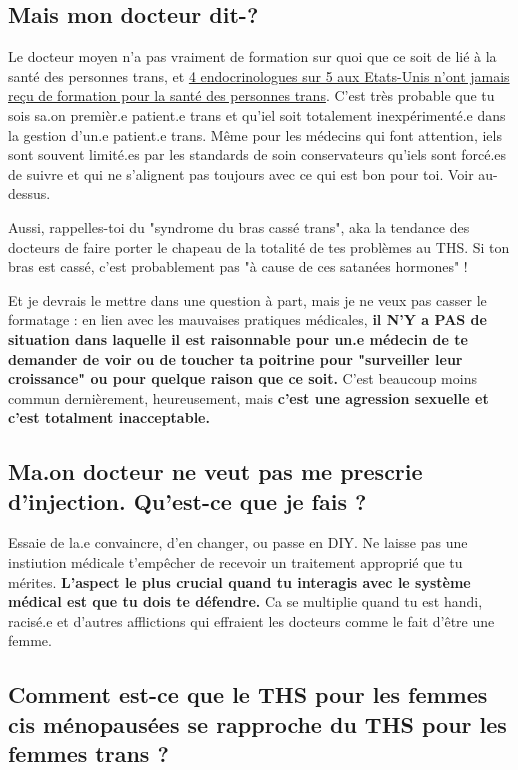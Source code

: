 \documentclass{article}
\begin{document}
\subsection{Mais mon docteur dit-?}

Le docteur moyen n'a pas vraiment de formation sur quoi que ce soit de lié à la santé des personnes trans, et \href{https://www.endocrine.org/news-and-advocacy/news-room/2017/endocrinologists-want-training-in-transgender-care }{4 endocrinologues sur 5 aux Etats-Unis n'ont jamais reçu de formation pour la santé des personnes trans}. C'est très probable que tu sois sa.on premièr.e patient.e trans et qu'iel soit totalement inexpérimenté.e dans la gestion d'un.e patient.e trans. Même pour les médecins qui font attention, iels sont souvent limité.es par les standards de soin conservateurs qu'iels sont forcé.es de suivre et qui ne s'alignent pas toujours avec ce qui est bon pour toi. Voir au-dessus.

Aussi, rappelles-toi du "syndrome du bras cassé trans", aka la tendance des docteurs de faire porter le chapeau de la totalité de tes problèmes au THS. Si ton bras est cassé, c'est probablement pas "à cause de ces satanées hormones" ! 

Et je devrais le mettre dans une question à part, mais je ne veux pas casser le formatage : en lien avec les mauvaises pratiques médicales, \textbf{il N'Y a PAS de situation dans laquelle il est raisonnable pour un.e médecin de te demander de voir ou de toucher ta poitrine pour "surveiller leur croissance" ou pour quelque raison que ce soit.} C'est beaucoup moins commun dernièrement, heureusement, mais \textbf{c'est une agression sexuelle et c'est totalment inacceptable.}

\subsection{Ma.on docteur ne veut pas me prescrie d'injection. Qu'est-ce que je fais ?}

Essaie de la.e convaincre, d'en changer, ou passe en DIY. Ne laisse pas une instiution médicale t'empêcher de recevoir un traitement approprié que tu mérites. \textbf{L'aspect le plus crucial quand tu interagis avec le système médical est que tu dois te défendre.} Ca se multiplie quand tu est handi, racisé.e et d'autres afflictions qui effraient les docteurs comme le fait d'être une femme.

\subsection{Comment est-ce que le THS pour les femmes cis ménopausées se rapproche du THS pour les femmes trans ?}\label{11-29}
\end{document}
